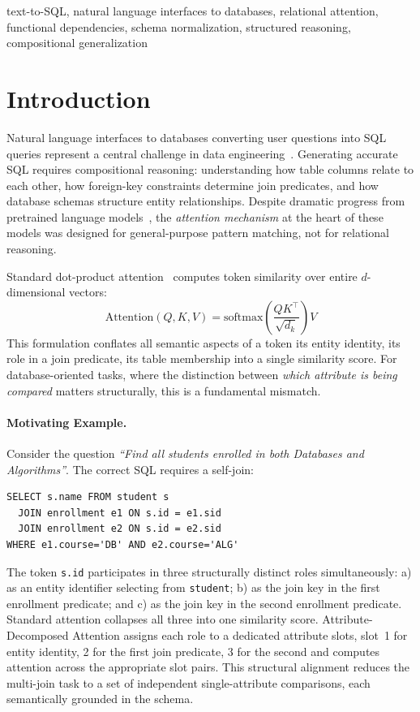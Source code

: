 \documentclass[conference]{IEEEtran}
\newcommand{\softmax}{\mathrm{softmax}}
\begin{document}
\begin{IEEEkeywords}
text-to-SQL, natural language interfaces to databases, relational attention, functional dependencies, schema normalization, structured reasoning, compositional generalization
\end{IEEEkeywords}

\section{Introduction}

Natural language interfaces to databases converting user questions into SQL queries represent a central challenge in data engineering~\cite{fu2023catsql,li2024nl2sql360,fan2023gar}. Generating accurate SQL requires compositional reasoning: understanding how table columns relate to each other, how foreign-key constraints determine join predicates, and how database schemas structure entity relationships. Despite dramatic progress from pretrained language models~\cite{qi2022rasat,bazaga2023sqlformer}, the \emph{attention mechanism} at the heart of these models was designed for general-purpose pattern matching, not for relational reasoning.

Standard dot-product attention~\cite{vaswani2017attention} computes token similarity over entire $d$-dimensional vectors:
\begin{equation}
\mathrm{Attention}(Q,K,V) = \softmax\!\left(\frac{QK^\top}{\sqrt{d_k}}\right)V
\label{eq:std}
\end{equation}
This formulation conflates all semantic aspects of a token its entity identity, its role in a join predicate, its table membership into a single similarity score. For database-oriented tasks, where the distinction between \emph{which attribute is being compared} matters structurally, this is a fundamental mismatch.

\paragraph{Motivating Example.}
Consider the question \textit{``Find all students enrolled in both Databases and Algorithms''}. The correct SQL requires a self-join:
\begin{verbatim}
SELECT s.name FROM student s
  JOIN enrollment e1 ON s.id = e1.sid
  JOIN enrollment e2 ON s.id = e2.sid
WHERE e1.course='DB' AND e2.course='ALG'
\end{verbatim}
The token \texttt{s.id} participates in three structurally distinct roles simultaneously: a) as an entity identifier selecting from \texttt{student}; b) as the join key in the first enrollment predicate; and c) as the join key in the second enrollment predicate. Standard attention collapses all three into one similarity score. Attribute-Decomposed Attention assigns each role to a dedicated attribute slots, slot~1 for entity identity, 2 for the first join predicate, 3 for the second and computes attention across the appropriate slot pairs. This structural alignment reduces the multi-join task to a set of independent single-attribute comparisons, each semantically grounded in the schema.
\end{document}
